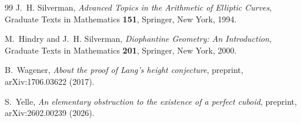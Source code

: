 \documentclass[11pt,reqno]{amsart}
\theoremstyle{plain}
\theoremstyle{definition}
\begin{document}
\begin{thebibliography}{99}
J.~H. Silverman,
\emph{Advanced Topics in the Arithmetic of Elliptic Curves},
Graduate Texts in Mathematics \textbf{151}, Springer, New York, 1994.

M.~Hindry and J.~H. Silverman,
\emph{Diophantine Geometry: An Introduction},
Graduate Texts in Mathematics \textbf{201}, Springer, New York, 2000.

B.~Wagener,
\emph{About the proof of Lang's height conjecture},
preprint, arXiv:1706.03622 (2017).

S.~Yelle,
\emph{An elementary obstruction to the existence of a perfect cuboid},
preprint, arXiv:2602.00239 (2026).

\end{thebibliography}
\end{document}
